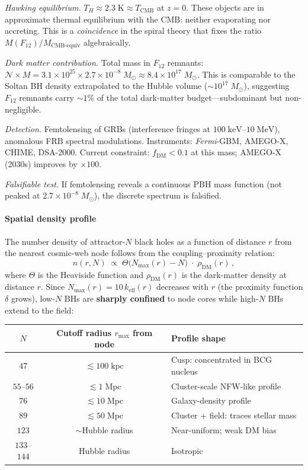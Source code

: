\documentclass[12pt,a4paper]{article}
\begin{document}
\textit{Hawking equilibrium.}\; $T_H \approx 2.3\;\mathrm{K} \approx T_{\mathrm{CMB}}$ at $z = 0$.  These objects are in approximate thermal equilibrium with the CMB: neither evaporating nor accreting.  This is a \emph{coincidence} in the spiral theory that fixes the ratio $M(F_{12})/M_{\mathrm{CMB\text{-}equiv}}$ algebraically.

\textit{Dark matter contribution.}\; Total mass in $F_{12}$ remnants: $\mathcal{N} \times M = 3.1 \times 10^{25} \times 2.7 \times 10^{-8}\;M_\odot \approx 8.4 \times 10^{17}\;M_\odot$.  This is comparable to the Soltan BH density extrapolated to the Hubble volume ($\sim 10^{17}\;M_\odot$), suggesting $F_{12}$ remnants carry $\sim 1\%$ of the total dark-matter budget---subdominant but non-negligible.

\textit{Detection.}\; Femtolensing of GRBs (interference fringes at $100\;\mathrm{keV}$--$10\;\mathrm{MeV}$), anomalous FRB spectral modulations.  Instruments: \emph{Fermi}-GBM, AMEGO-X, CHIME, DSA-2000.  Current constraint: $f_{\mathrm{DM}} < 0.1$ at this mass; AMEGO-X (2030s) improves by $\times 100$.

\textit{Falsifiable test.}\; If femtolensing reveals a continuous PBH mass function (not peaked at $2.7 \times 10^{-8}\;M_\odot$), the discrete spectrum is falsified.

\paragraph{Spatial density profile}
\label{sec:bh-spatial-density}

The number density of attractor-$N$ black holes as a function of distance $r$ from the nearest cosmic-web node follows from the coupling--proximity relation:
\begin{equation}
n(r, N) \;\propto\; \Theta\!\bigl(N_{\max}(r) - N\bigr)\;\cdot\; \rho_{\mathrm{DM}}(r)\,,
\end{equation}
where $\Theta$ is the Heaviside function and $\rho_{\mathrm{DM}}(r)$ is the dark-matter density at distance $r$.  Since $N_{\max}(r) = 10\,k_{\mathrm{eff}}(r)$ decreases with $r$ (the proximity function $\delta$ grows), low-$N$ BHs are \textbf{sharply confined} to node cores while high-$N$ BHs extend to the field:

\begin{center}\small
\begin{tabular}{c|c|l}
$N$ & Cutoff radius $r_{\max}$ from node & Profile shape \\
\hline
$47$ & $\lesssim 100\;\mathrm{kpc}$ & Cusp: concentrated in BCG nucleus \\
$55$--$56$ & $\lesssim 1\;\mathrm{Mpc}$ & Cluster-scale NFW-like profile \\
$76$ & $\lesssim 10\;\mathrm{Mpc}$ & Galaxy-density profile \\
$89$ & $\lesssim 50\;\mathrm{Mpc}$ & Cluster + field: traces stellar mass \\
$123$ & $\sim$Hubble radius & Near-uniform; weak DM bias \\
$133$--$144$ & Hubble radius & Isotropic \\
\end{tabular}
\end{center}
\end{document}
